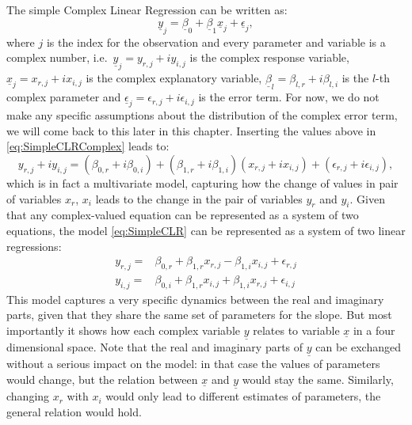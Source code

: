 \documentclass[
]{book}
\begin{document}
The simple Complex Linear Regression can be written as:
\begin{equation}
    \underline{y}_j = \underline{\beta}_0 + \underline{\beta}_1 \underline{x}_j + \underline{\epsilon}_j,
    \label{eq:SimpleCLRComplex}
\end{equation}
where \(j\) is the index for the observation and every parameter and variable is a complex number, i.e.~\(\underline{y}_j = y_{r,j}+i y_{i,j}\) is the complex response variable, \(\underline{x}_j = x_{r,j}+i x_{i,j}\) is the complex explanatory variable, \(\underline{\beta}_{l} = \beta_{l,r} + i \beta_{l,i}\) is the \(l\)-th complex parameter and \(\underline{\epsilon}_j = \epsilon_{r,j} + i \epsilon_{i,j}\) is the error term. For now, we do not make any specific assumptions about the distribution of the complex error term, we will come back to this later in this chapter. Inserting the values above in \eqref{eq:SimpleCLRComplex} leads to:
\begin{equation}
    y_{r,j}+i y_{i,j} = (\beta_{0,r} + i \beta_{0,i}) + (\beta_{1,r} + i \beta_{1,i}) (x_{r,j}+i x_{i,j}) + (\epsilon_{r,j} + i \epsilon_{i,j}),
    \label{eq:SimpleCLR}
\end{equation}
which is in fact a multivariate model, capturing how the change of values in pair of variables \(x_r\), \(x_i\) leads to the change in the pair of variables \(y_r\) and \(y_i\). Given that any complex-valued equation can be represented as a system of two equations, the model \eqref{eq:SimpleCLR} can be represented as a system of two linear regressions:
\begin{equation}
    \begin{aligned}
        y_{r,j} = & \beta_{0,r} + \beta_{1,r} x_{r,j} - \beta_{1,i} x_{i,j} + \epsilon_{r,j} \\
        y_{i,j} = & \beta_{0,i} + \beta_{1,r} x_{i,j} + \beta_{1,i} x_{r,j} + \epsilon_{i,j}
    \end{aligned}
    \label{eq:SimpleCLRSystem}
\end{equation}
This model captures a very specific dynamics between the real and imaginary parts, given that they share the same set of parameters for the slope. But most importantly it shows how each complex variable \(\underline{y}\) relates to variable \(\underline{x}\) in a four dimensional space. Note that the real and imaginary parts of \(\underline{y}\) can be exchanged without a serious impact on the model: in that case the values of parameters would change, but the relation between \(\underline{x}\) and \(\underline{y}\) would stay the same. Similarly, changing \(x_r\) with \(x_i\) would only lead to different estimates of parameters, the general relation would hold.
\end{document}
